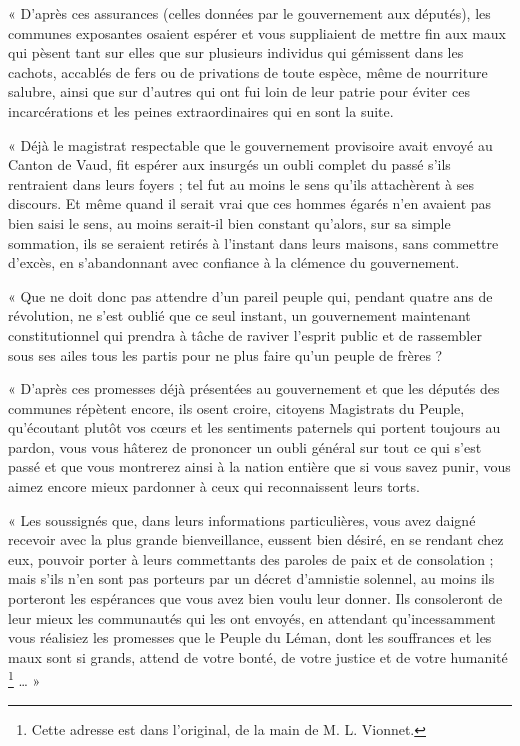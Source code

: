 \documentclass[french,twoside]{book} %
\newenvironment{quoteblock}%
  {\begin{quoting}}
  {\end{quoting}}
\newenvironment{quotebar}{%
    \def\FrameCommand{{\color{rubric!10!}\vrule width 0.5em} \hspace{0.9em}}%
    \def\OuterFrameSep{\itemsep} %
    \MakeFramed {\advance\hsize-\width \FrameRestore}
  }%
  {%
    \endMakeFramed
  }
\renewenvironment{quoteblock}%
  {%
    \savenotes
    \setstretch{0.9}
    \begin{quotebar}
  }
  {%
    \end{quotebar}
    \spewnotes
  }
\begin{document}
\begin{quoteblock}
 \noindent « D’après ces assurances (celles données par le gouvernement aux députés), les communes exposantes osaient espérer et vous suppliaient de mettre fin aux maux qui pèsent tant sur elles que sur plusieurs individus qui gémissent dans les cachots, accablés de fers ou de privations de toute espèce, même de nourriture salubre, ainsi que sur d’autres qui ont fui loin de leur patrie pour éviter ces incarcérations et les peines extraordinaires qui en sont la suite.\par
 « Déjà le magistrat respectable que le gouvernement provisoire avait envoyé au Canton de Vaud, fit espérer aux insurgés un oubli complet du passé s’ils rentraient dans leurs foyers ; tel fut au moins le sens qu’ils attachèrent à ses discours. Et même quand il serait vrai que ces hommes égarés n’en avaient pas bien saisi le sens, au moins serait-il bien constant qu’alors, sur sa simple sommation, ils se seraient retirés à l’instant dans leurs maisons, sans commettre d’excès, en s’abandonnant avec confiance à la clémence du gouvernement.\par
 « Que ne doit donc pas attendre d’un pareil peuple qui, pendant quatre ans de révolution, ne s’est oublié que ce seul instant, un gouvernement maintenant constitutionnel qui prendra à tâche de raviver l’esprit public et de rassembler sous ses ailes tous les partis pour ne plus faire qu’un peuple de frères ?\par
 « D’après ces promesses déjà présentées au gouvernement et que les députés des communes répètent encore, ils osent croire, citoyens Magistrats du Peuple, qu’écoutant plutôt vos cœurs et les sentiments paternels qui portent toujours au pardon, vous vous hâterez de prononcer un oubli général sur tout ce qui s’est passé et que vous montrerez ainsi à la nation entière que si vous savez punir, vous aimez encore mieux pardonner à ceux qui reconnaissent leurs torts.\par
 « Les soussignés que, dans leurs informations particulières, vous avez daigné recevoir avec la plus grande bienveillance, eussent bien désiré, en se rendant chez eux, pouvoir porter à leurs commettants des paroles de paix et de consolation ; mais s’ils n’en sont pas porteurs par un décret d’amnistie solennel, au moins ils porteront les espérances que vous avez bien voulu leur donner. Ils consoleront de leur mieux les communautés qui les ont envoyés, en attendant qu’incessamment vous réalisiez les promesses que le Peuple du Léman, dont les souffrances et les maux sont si grands, attend de votre bonté, de votre justice et de votre humanité \footnote{Cette adresse est dans l’original, de la main de M. L. Vionnet.} … »
 \end{quoteblock}
\end{document}
